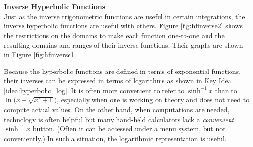\noindent\textbf{\large Inverse Hyperbolic Functions}\\

Just as the inverse trigonometric functions are useful in certain integrations, the inverse hyperbolic functions are useful with others. Figure \ref{fig:hfinverse2} shows the restrictions on the domains to make each function one-to-one and the resulting domains and ranges of their inverse functions. Their graphs are shown in Figure \ref{fig:hfinverse1}.

Because the hyperbolic functions are defined in terms of exponential functions, their inverses can be expressed in terms of logarithms as shown in Key Idea \ref{idea:hyperbolic_log}. It is often more convenient to refer to $\sinh^{-1}x$ than to $\ln\big(x+\sqrt{x^2+1}\big)$, especially when one is working on theory and does not need to compute actual values. On the other hand, when computations are needed, technology is often helpful but many hand-held calculators lack a \textit{convenient} $\sinh^{-1}x$ button. (Often it can be accessed under a menu system, but not conveniently.) In such a situation, the logarithmic representation is useful.
\clearpage


%


